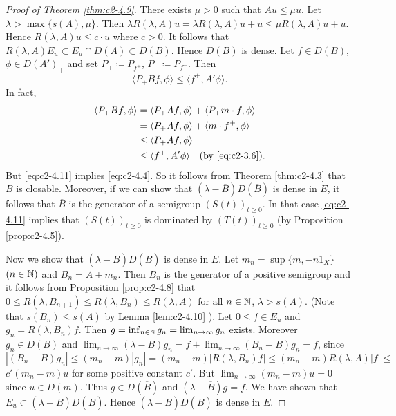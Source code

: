 \begin{proof}[Proof of Theorem \ref{thm:c2-4.9}]  
There exists $\mu > 0$ such that $Au \leq \mu u$.
Let $\lambda > \max \{s(A),\mu\}$.
Then $\lambda R(\lambda,A)u = \lambda R(\lambda,A)u+u \leq \mu R(\lambda,A)u + u$.
Hence $R(\lambda,A)u \leq c \cdot u$ where $c > 0$.
It follows that $R(\lambda,A)E_{u} \subset E_{u} \cap D(A) \subset D(B)$.
Hence $D(B)$ is dense.
Let $f \in D(B)$, $\phi \in D(A')_{+}$ and set $P_{+} \coloneqq P_{f^{+}}$, $P_{-} \coloneqq P_{f^{-}}$.
Then
\begin{equation}\label{eq:c2-4.11}
\langle P_{+} Bf,\phi \rangle \leq \langle f^{+},A'\phi \rangle.
\end{equation}
In fact, 
\begin{align*}
\langle P_{+} Bf, \phi \rangle &= \langle P_{+} Af, \phi \rangle + \langle P_{+} m \cdot f, \phi \rangle\\
&= \langle P_{+} Af, \phi \rangle + \langle m \cdot f^{+}, \phi \rangle\\
&\leq \langle P_{+} Af, \phi \rangle\\
&\leq \langle f^{+}, A'\phi \rangle \quad \text{(by \eqref{eq:c2-3.6})}.
\end{align*}
But \eqref{eq:c2-4.11} implies \eqref{eq:c2-4.4}.
So it follows from Theorem \ref{thm:c2-4.3}   that $B$ is closable.
Moreover, if we can show that $(\lambda - \overline{B})D(\overline{B})$ is dense in $E$, it follows that $\overline{B}$ is the generator of a semigroup $(S(t))_{t \geq 0}$.
In that case \eqref{eq:c2-4.11} implies that $(S(t))_{t \geq 0}$ is dominated by $(T(t))_{t \geq 0}$ 
(by Proposition \ref{prop:c2-4.5}).

Now we show that $(\lambda - \overline{B})D(\overline{B})$ is dense in $E$.
Let $m_{n} = \sup \{m, -n1_{X}\}$ $(n \in \mathbb{N} )$ and $B_{n} = A + m_{n}$.
Then $B_{n}$ is the generator of a positive semigroup and it follows from Proposition \ref{prop:c2-4.8}   that $0 \leq R(\lambda,B_{n+1}) \leq R(\lambda,B_{n}) \leq R(\lambda,A)$ for all $n \in \mathbb{N} $, $\lambda > s(A)$.
(Note that $s(B_{n}) \leq s(A)$ by Lemma \ref{lem:c2-4.10}   ).
Let $0 \leq f \in E_{u}$ and $g_{n} = R(\lambda,B_{n})f$.
Then $g = \inf_{n \in \mathbb{N} } g_{n} = \lim_{n \to \infty} g_{n}$ exists.
Moreover $g_{n} \in D(B)$ and $\lim_{n \to \infty} (\lambda - B)g_{n} = f + \lim_{n \to \infty} (B_{n} - B)g_{n} = f$, since
$|(B_{n} - B)g_{n}| \leq (m_{n} - m)|g_{n}| = (m_{n} - m)|R(\lambda,B_{n})f| \leq (m_{n} - m)R(\lambda,A)|f| \leq$
$c' (m_{n} - m)u$ for some positive constant $c'$.
But $\lim_{n \to \infty} (m_{n} - m)u = 0$ since $u \in D(m)$.
Thus $g \in D(\overline{B})$ and $(\lambda - \overline{B})g = f$.
We have shown that $E_{u} \subset (\lambda - \overline{B})D(\overline{B})$.
Hence $(\lambda - \overline{B})D(\overline{B})$ is dense in $E$.
\end{proof}
